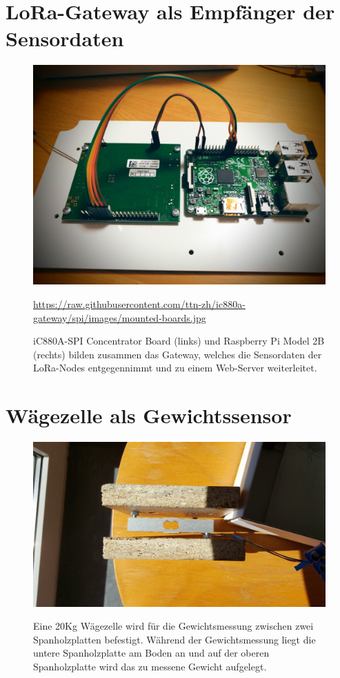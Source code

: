 \section{LoRa-Gateway als Empfänger der Sensordaten}
\begin{figure}[ht]
    \center
    \includegraphics[width=15cm]{Bilder/mounted-boards.jpg}\\
    \caption{iC880A-SPI Concentrator Board (links) und Raspberry Pi Model 2B (rechts) bilden zusammen das Gateway, welches die Sensordaten der LoRa-Nodes entgegennimmt und zu einem Web-Server weiterleitet.}
    \begin{flushleft}
        \quelle\url{https://raw.githubusercontent.com/ttn-zh/ic880a-gateway/spi/images/mounted-boards.jpg}
    \end{flushleft}
    \label{fig:UeberblickDerBauteile}
\end{figure}
\newpage
\section{Wägezelle als Gewichtssensor}
\begin{figure}[ht]
    \center
    \includegraphics[width=15cm]{Bilder/waegezelle.jpg}\\
    \caption{Eine 20Kg Wägezelle wird für die Gewichtsmessung zwischen zwei Spanholzplatten befestigt. Während der Gewichtsmessung liegt die untere Spanholzplatte am Boden an und auf der oberen Spanholzplatte wird das zu messene Gewicht aufgelegt.}
    \label{fig:Waegezelle}
\end{figure}
\newpage

